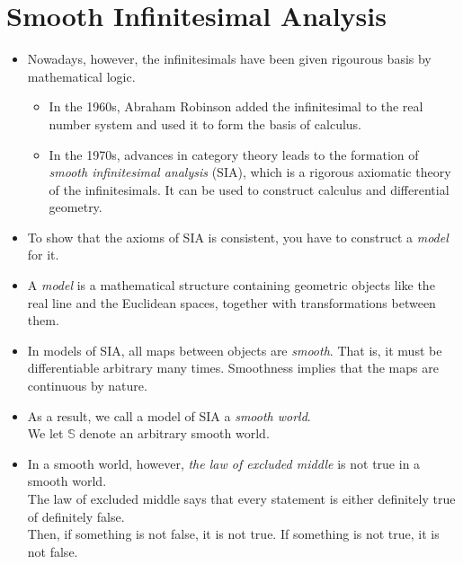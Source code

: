 \documentclass[10pt]{article}
\begin{document}

  \section{Smooth Infinitesimal Analysis} %
  
  \begin{itemize}
  	\item Nowadays, however, the infinitesimals have been given rigourous basis by mathematical logic.
  	\begin{itemize}
  		\item In the 1960s, Abraham Robinson added the infinitesimal to the real number system and used it to form the basis of calculus.

  		\item In the 1970s, advances in category theory leads to the formation of \emph{smooth infinitesimal analysis} (SIA), which is a rigorous axiomatic theory of the infinitesimals. It can be used to construct calculus and differential geometry.
  	\end{itemize}

  	\item To show that the axioms of SIA is consistent, you have to construct a \emph{model} for it.

  	\item A \emph{model} is a mathematical structure containing geometric objects like the real line and the Euclidean spaces, together with transformations between them.

  	\item In models of SIA, all maps between objects are \emph{smooth}. That is, it must be differentiable arbitrary many times. Smoothness implies that the maps are continuous by nature.

  	\item As a result, we call a model of SIA a \emph{smooth world}.\\
  	We let $\mathbb{S}$ denote an arbitrary smooth world.

  	\item In a smooth world, however, \emph{the law of excluded middle} is not true in a smooth world.\\
  	The law of excluded middle says that every statement is either definitely true of definitely false.\\
  	Then, if something is not false, it is not true. If something is not true, it is not false.


\end{itemize}
\end{document}
